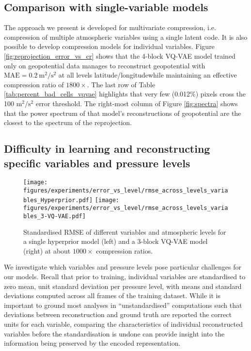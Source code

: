 \documentclass[11pt, a4paper, logo, copyright, numbering]{googledeepmind}
\begin{document}
\subsection{Comparison with single-variable models}
\label{sx:discuss:geopotential}

The approach we present is developed for multivariate compression, i.e. compression of multiple atmospheric variables using a single latent code.
It is also possible to develop compression models for individual variables.
Figure \ref{fig:reprojection_error_vs_cr} shows that the 4-block VQ-VAE model trained only on geopotential data manages to reconstruct geopotential with $\text{MAE} = 0.2~\text{m}^2/\text{s}^2$ at all levels latitude/longitudewhile maintaining an effective compression ratio of $1800\times$. The last row of Table \ref{tab:percent_bad_cells_vqvae} highlights that very few (0.012\%) pixels cross the 100 $\text{m}^2/\text{s}^2$ error threshold. The right-most column of Figure \ref{fig:spectra} shows that the power spectrum of that model's reconstructions of geopotential are the closest to the spectrum of the reprojection.




\subsection{Difficulty in learning and reconstructing specific variables and pressure levels}
\label{sx:discuss:limitation-artefacts}

\begin{figure}
    \centering
    \texttt{[image: figures/experiments/error\_vs\_level/rmse\_across\_levels\_variables\_Hyperprior.pdf]}
    \texttt{[image: figures/experiments/error\_vs\_level/rmse\_across\_levels\_variables\_3-VQ-VAE.pdf]}
    \hfill
    \caption{Standardised RMSE of different variables and atmospheric levels for a single hyperprior model (left) and a 3-block VQ-VAE model (right) at about $1000\times$ compression ratios.}
    \label{fig:rmse_comparison_variables}
\end{figure}

We investigate which variables and pressure levels pose particular challenges for our models.
Recall that prior to training, individual variables are standardised to zero mean, unit standard deviation per pressure level, with means and standard deviations computed across all frames of the training dataset.
While it is important to ground most analyses in ``unstandardised'' computations such that deviations between reconstruction and ground truth are reported the correct units for each variable, comparing the characteristics of individual reconstructed variables before the standardisation is undone can provide insight into the information being preserved by the encoded representation.
\end{document}
